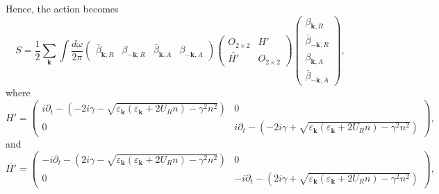 \documentclass[aps,onecolumn,superscriptaddress,notitlepage,longbibliography]{revtex4-1}
\newcommand{\tmmathbf}[1]{\ensuremath{\boldsymbol{#1}}}
\begin{document}
Hence, the action becomes
\begin{equation}
  S = \frac{1}{2} \sum_{\tmmathbf{k}} \int \frac{d \omega}{2 \pi}
  \left(\begin{array}{cccc}
    \bar{\beta}_{\tmmathbf{k}, R} & \beta_{- \tmmathbf{k}, R} &
    \bar{\beta}_{\tmmathbf{k}, A} & \beta_{- \tmmathbf{k}, A}
  \end{array}\right) \left(\begin{array}{cc}
    O_{2 \times 2} & H'\\
    \bar{H'} & O_{2 \times 2}
  \end{array}\right) \left(\begin{array}{c}
    \beta_{\tmmathbf{k}, R}\\
    \bar{\beta}_{- \tmmathbf{k}, R}\\
    \beta_{\tmmathbf{k}, A}\\
    \bar{\beta}_{- \tmmathbf{k}, A}
  \end{array}\right),
\end{equation}
where
\begin{equation}
  H' = \left(\begin{array}{cc}
    i \partial_t - \left( - 2 i \gamma - \sqrt{\varepsilon_{\tmmathbf{k}}
    (\varepsilon_{\tmmathbf{k}} + 2 U_R n) - \gamma^2 n^2} \right) & 0\\
    0 & i \partial_t - \left( - 2 i \gamma + \sqrt{\varepsilon_{\tmmathbf{k}}
    (\varepsilon_{\tmmathbf{k}} + 2 U_R n) - \gamma^2 n^2} \right)
  \end{array}\right) , \label{Eq:Hprime}
\end{equation}
and 
\begin{equation}
  \bar{H'} = \left(\begin{array}{cc}
    -i \partial_t - \left( 2 i \gamma - \sqrt{\varepsilon_{\tmmathbf{k}}
    (\varepsilon_{\tmmathbf{k}} + 2 U_R n) - \gamma^2 n^2} \right) & 0\\
    0 & -i \partial_t - \left(  2 i \gamma + \sqrt{\varepsilon_{\tmmathbf{k}}
    (\varepsilon_{\tmmathbf{k}} + 2 U_R n) - \gamma^2 n^2} \right)
  \end{array}\right) ,
\end{equation}
\end{document}
